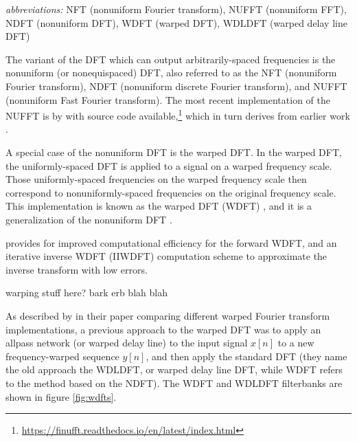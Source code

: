 \documentclass[letter,12pt,notitlepage]{article}
\begin{document}
\qquad \textit{abbreviations:} NFT (nonuniform Fourier transform), NUFFT (nonuniform FFT), NDFT (nonuniform DFT), WDFT (warped DFT), WDLDFT (warped delay line DFT)

The variant of the DFT which can output arbitrarily-spaced frequencies is the nonuniform (or nonequispaced) DFT, also referred to as the NFT (nonuniform Fourier transform), NDFT (nonuniform discrete Fourier transform), and NUFFT (nonuniform Fast Fourier transform). The most recent implementation of the NUFFT is by \citet{nufft1} with source code available,\footnote{\href{https://finufft.readthedocs.io/en/latest/index.html}{https://finufft.readthedocs.io/en/latest/index.html}} which in turn derives from earlier work \cite{nufft2, nufft3}.

A special case of the nonuniform DFT is the warped DFT. In the warped DFT, the uniformly-spaced DFT is applied to a signal on a warped frequency scale. Those uniformly-spaced frequencies on the warped frequency scale then correspond to nonuniformly-spaced frequencies on the original frequency scale. This implementation is known as the warped DFT (WDFT) \cite{warped1}, and it is a generalization of the nonuniform DFT \cite{nufft3}.

\citet{warped2} provides for improved computational efficiency for the forward WDFT, and an iterative inverse WDFT (IIWDFT) computation scheme to approximate the inverse transform with low errors.

warping stuff here? bark erb blah blah

As described by \citet{warpedcomparison} in their paper comparing different warped Fourier transform implementations, a previous approach to the warped DFT \cite{earlywarped1, earlywarped2} was to apply an allpass network (or warped delay line) to the input signal $x[n]$ to a new frequency-warped sequence $y[n]$, and then apply the standard DFT (they name the old approach the WDLDFT, or warped delay line DFT, while WDFT refers to the method based on the NDFT). The WDFT and WDLDFT filterbanks are shown in figure \ref{fig:wdfts}.
\end{document}
